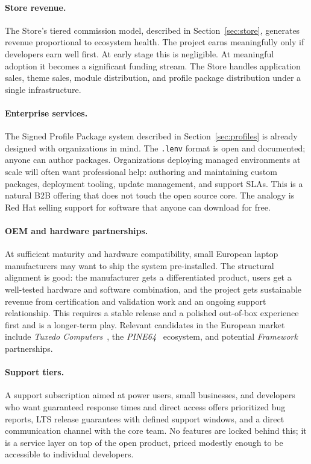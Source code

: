 \paragraph{Store revenue.}
The Store's tiered commission model, described in Section~\ref{sec:store},
generates revenue proportional to ecosystem health. The project earns
meaningfully only if developers earn well first. At early stage this is
negligible. At meaningful adoption it becomes a significant funding stream. The
Store handles application sales, theme sales, module distribution, and profile
package distribution under a single infrastructure.

\paragraph{Enterprise services.}
The Signed Profile Package system described in Section~\ref{sec:profiles} is
already designed with organizations in mind. The \texttt{.lenv} format is open
and documented; anyone can author packages. Organizations deploying managed
environments at scale will often want professional help: authoring and
maintaining custom packages, deployment tooling, update management, and support
SLAs. This is a natural B2B offering that does not touch the open source core.
The analogy is Red Hat selling support for software that anyone can download
for free.

\paragraph{OEM and hardware partnerships.}
At sufficient maturity and hardware compatibility, small European laptop
manufacturers may want to ship the system pre-installed. The structural
alignment is good: the manufacturer gets a differentiated product, users get a
well-tested hardware and software combination, and the project gets sustainable
revenue from certification and validation work and an ongoing support
relationship. This requires a stable release and a polished out-of-box
experience first and is a longer-term play. Relevant candidates in the European market include
\emph{Tuxedo Computers}~\cite{tuxedo}, the \emph{PINE64}~\cite{pine64}
ecosystem, and potential \emph{Framework}~\cite{framework} partnerships.

\paragraph{Support tiers.}
A support subscription aimed at power users, small businesses, and developers
who want guaranteed response times and direct access offers prioritized bug
reports, LTS release guarantees with defined support windows, and a direct
communication channel with the core team. No features are locked behind this;
it is a service layer on top of the open product, priced modestly enough to be
accessible to individual developers.

